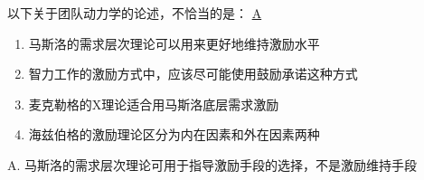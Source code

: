 \begin{problem}
	以下关于团队动力学的论述，不恰当的是： 
	\uline{A}    
        \begin{enumerate}[label=\Alph*.]
            \item 马斯洛的需求层次理论可以用来更好地维持激励水平
            \item 智力工作的激励方式中，应该尽可能使用鼓励承诺这种方式
            \item 麦克勒格的X理论适合用马斯洛底层需求激励
            \item 海兹伯格的激励理论区分为内在因素和外在因素两种
        \end{enumerate}
\end{problem}

\begin{solution}
A. 马斯洛的需求层次理论可用于指导激励手段的选择，不是激励维持手段
\end{solution}


